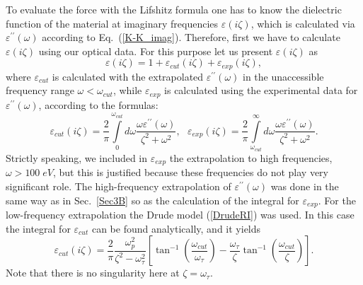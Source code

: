 \documentclass[prb]{revtex4}%
\begin{document}
To evaluate the force with the Lifshitz formula one has to know the
dielectric function of the material at imaginary frequencies
$\varepsilon(i\zeta)$, which is calculated via
$\varepsilon^{\prime\prime}(\omega)$ according to
Eq.~(\ref{K-K_imag}). Therefore, first we have to calculate
$\varepsilon(i\zeta)$ using our optical data. For this purpose let
us present $\varepsilon(i\zeta)$ as
%
\begin{equation}\label{eps2part}
    \varepsilon(i\zeta)=1+\varepsilon_{cut}(i\zeta)+\varepsilon_{exp}(i\zeta),
\end{equation}
%
where $\varepsilon_{cut}$ is calculated with the extrapolated
$\varepsilon^{\prime\prime}(\omega)$ in the unaccessible frequency
range $\omega<\omega_{cut}$, while $\varepsilon_{exp}$ is calculated
using the experimental data for
$\varepsilon^{\prime\prime}(\omega)$, according to the formulas:
%
\begin{equation}\label{part12}
    \varepsilon_{cut}(i\zeta)=\frac{2}{\pi}\int\limits_{0}^{\omega_{cut}}d\omega
    \frac{\omega\varepsilon^{\prime\prime}(\omega)}{\zeta^2+\omega^2},\
    \ \ \varepsilon_{exp}(i\zeta)=\frac{2}{\pi}\int\limits_{\omega_{cut}}^{\infty}d\omega
    \frac{\omega\varepsilon^{\prime\prime}(\omega)}{\zeta^2+\omega^2}.
\end{equation}
%
Strictly speaking, we included in $\varepsilon_{exp}$ the
extrapolation to high frequencies, $\omega>100\;eV$, but this is
justified because these frequencies do not play very significant
role. The high-frequency extrapolation of
$\varepsilon^{\prime\prime}(\omega)$ was done in the same way as in
Sec.~\ref{Sec3B} so as the calculation of the integral for
$\varepsilon_{exp}$. For the low-frequency extrapolation the Drude
model (\ref{DrudeRI}) was used. In this case the integral for
$\varepsilon_{cut}$ can be found analytically, and it yields
%
\begin{equation}\label{epscut}
    \varepsilon_{cut}(i\zeta)=\frac{2}{\pi}\frac{\omega_p^2}{\zeta^2-\omega_{\tau}^2}
    \left[\tan^{-1}\left(\frac{\omega_{cut}}{\omega_{\tau}}\right)-
    \frac{\omega_{\tau}}{\zeta}\tan^{-1}\left(\frac{\omega_{cut}}{\zeta}\right)\right].
\end{equation}
%
Note that there is no singularity here at $\zeta=\omega_{\tau}$.
\end{document}
